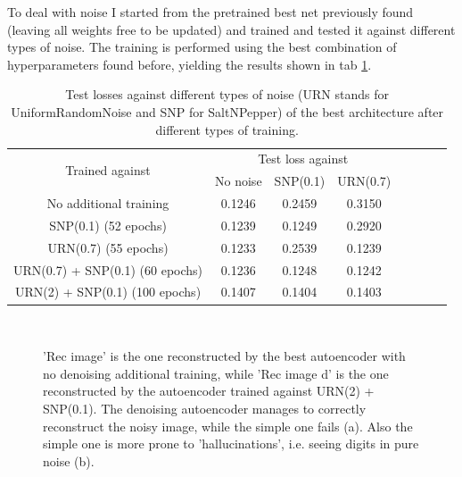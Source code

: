 \documentclass[a4paper, 11pt]{article}
\begin{document}
    To deal with noise I started from the pretrained best net previously found (leaving all weights free to be updated) and trained and tested it against different types of noise. The training is performed using the best combination of hyperparameters found before, yielding the results shown in tab \ref{tab:denoising_loss}.
    \begin{table}[H]
      \centering
      \begin{tabular}{c|ccccccc}
        \multirow{2}{*}{Trained against} & \multicolumn{3}{c}{Test loss against} \\
          & No noise & SNP(0.1) & URN(0.7) \\
        \midrule
        No additional training & 0.1246 & 0.2459 & 0.3150 \\
        SNP(0.1) (52 epochs) & 0.1239 & 0.1249 & 0.2920 \\
        URN(0.7) (55 epochs) & 0.1233 & 0.2539 & 0.1239 \\
        URN(0.7) + SNP(0.1) (60 epochs) & 0.1236 & 0.1248 & 0.1242 \\
        URN(2) + SNP(0.1) (100 epochs) & 0.1407 & 0.1404 & 0.1403 \\
        \bottomrule
      \end{tabular}
      \caption{Test losses against different types of noise (URN stands for UniformRandomNoise and SNP for SaltNPepper) of the best architecture after different types of training.}
      \label{tab:denoising_loss}
    \end{table}
    \begin{figure}
      \centering
       \,
      \caption{'Rec image' is the one reconstructed by the best autoencoder with no denoising additional training, while 'Rec image d' is the one reconstructed by the autoencoder trained against URN(2) + SNP(0.1). The denoising autoencoder manages to correctly reconstruct the noisy image, while the simple one fails (a). Also the simple one is more prone to 'hallucinations', i.e. seeing digits in pure noise (b).}
      \label{fig:hallucination}
    \end{figure}
\end{document}
